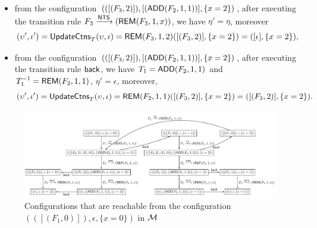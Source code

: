 \begin{example}
\begin{itemize}
            \item from the configuration $(([(F_3,2)]),[(\mathsf{ADD}(F_2,1,1))],\{x=2\})$, after executing the transition rule $F_3\xrightarrow{{\sf NTS}}(\mathsf{REM}(F_3,1,x))$, we have $\eta' = \eta$, moreover
            $$(\upsilon', \iota') = \mathsf{UpdateCtns}_{T}(\upsilon, \iota) = \mathsf{REM}(F_3,1,2)([(F_3,2)],\{x=2\})=([\epsilon], \{x=2\}),$$ 
            \item from the configuration $(([(F_3,2)]),[(\mathsf{ADD}(F_2,1,1))],\{x=2\})$, after executing the transition rule ${\mathsf{back} }$, we have $T_1 = \mathsf{ADD}(F_2,1,1)$ and $T_1^{-1} = \mathsf{REM}(F_2, 1,1)$, $\eta' = \epsilon$, moreover,
            $$(\upsilon', \iota') = \mathsf{UpdateCtns}_{T}(\upsilon, \iota) = \mathsf{REM}(F_2,1,1)([(F_3,2)],\{x=2\})=([(F_3,2)], \{x=2\}).$$ 
        \end{itemize}

    
    \begin{figure}[htbp]
            \centering
            \includegraphics[scale = 0.6]{frg-example.pdf}
            \caption{Configurations that are reachable from the configuration $(([(F_1,0)]),\epsilon,\{x=0\})$ in ${\mathcal{M} }$}
        \label{frg-example}
    \end{figure}


\end{example}
